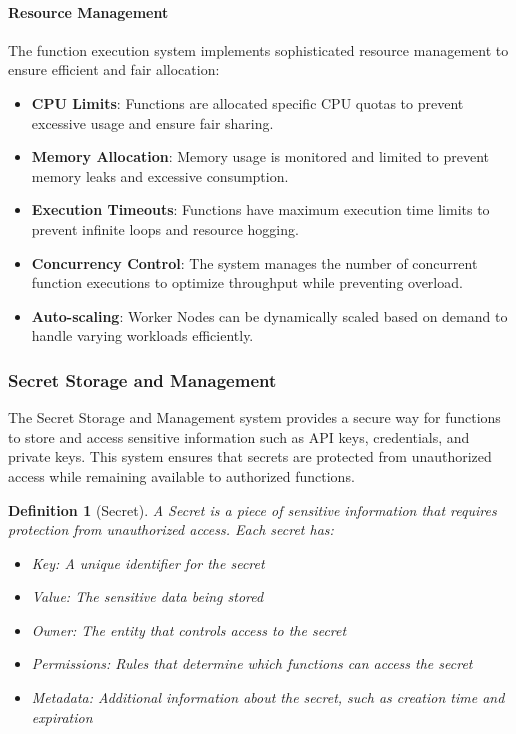 \documentclass{article}
\newtheorem{definition}{Definition}
\begin{document}
\paragraph{Resource Management}
The function execution system implements sophisticated resource management to ensure efficient and fair allocation:

\begin{itemize}
    \item \textbf{CPU Limits}: Functions are allocated specific CPU quotas to prevent excessive usage and ensure fair sharing.
    
    \item \textbf{Memory Allocation}: Memory usage is monitored and limited to prevent memory leaks and excessive consumption.
    
    \item \textbf{Execution Timeouts}: Functions have maximum execution time limits to prevent infinite loops and resource hogging.
    
    \item \textbf{Concurrency Control}: The system manages the number of concurrent function executions to optimize throughput while preventing overload.
    
    \item \textbf{Auto-scaling}: Worker Nodes can be dynamically scaled based on demand to handle varying workloads efficiently.
\end{itemize}

\subsubsection{Secret Storage and Management}
\label{subsubsec:secret-storage}

The Secret Storage and Management system provides a secure way for functions to store and access sensitive information such as API keys, credentials, and private keys. This system ensures that secrets are protected from unauthorized access while remaining available to authorized functions.



\begin{definition}[Secret]
A Secret is a piece of sensitive information that requires protection from unauthorized access. Each secret has:
\begin{itemize}
    \item Key: A unique identifier for the secret
    \item Value: The sensitive data being stored
    \item Owner: The entity that controls access to the secret
    \item Permissions: Rules that determine which functions can access the secret
    \item Metadata: Additional information about the secret, such as creation time and expiration
\end{itemize}
\end{definition}
\end{document}
